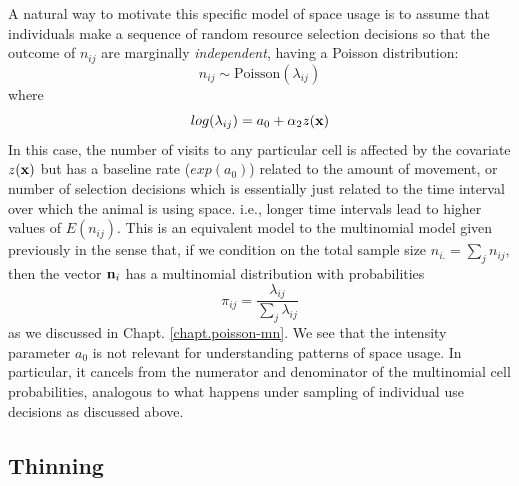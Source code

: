 A natural way to motivate this specific model of space usage is to
assume that individuals make a sequence of random resource selection
decisions so that the outcome of $n_{ij}$ are marginally {\it
  independent}, having a Poisson distribution:
\[
 n_{ij} \sim \mbox{Poisson}( \lambda_{ij})
\]
where
\[
 log(\lambda_{ij}) = a_{0}  + \alpha_{2} z({\bf x})
\]
In this case,
 the number of visits to any particular cell is affected by
the covariate $z({\bf x})$ but has a baseline rate ($exp(a_{0})$) related to the amount
of movement, or number of selection decisions which is essentially
just related to the time interval over which the animal is using
space. i.e., longer time intervals lead to higher values of
$E(n_{ij})$.
This is an equivalent model to the multinomial model given previously
in the sense that, if we condition on the total sample size $n_{i.} =
\sum_{j} n_{ij}$, then the vector ${\bf n}_{i}$ has a multinomial
distribution with probabilities
\[
 \pi_{ij} = \frac{\lambda_{ij}}{ \sum_{j} \lambda_{ij}}
\]
as we discussed in Chapt. \ref{chapt.poisson-mn}.  We see that the
intensity parameter $a_{0}$ is not relevant for understanding
patterns of space usage. In particular, it cancels from the numerator
and denominator of the multinomial cell probabilities, analogous to
what happens under sampling of individual use decisions as discussed
above. 

\subsection{Thinning}

